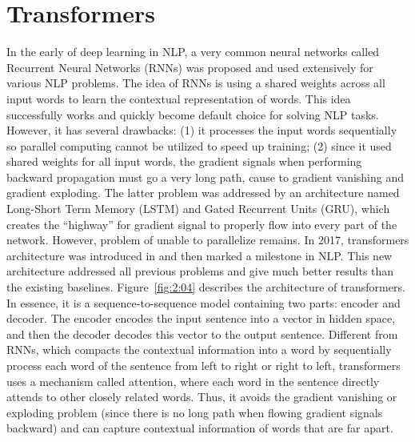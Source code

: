 \documentclass[3p, sort&compress, 12pt]{elsarticle}
\begin{document}
\section{Transformers}
In the early of deep learning in NLP, a very common neural networks called Recurrent Neural Networks (RNNs) was proposed and used extensively for various NLP problems. The idea of RNNs is using a shared weights across all input words to learn the contextual representation of words. This idea successfully works and quickly become default choice for solving NLP tasks. However, it has several drawbacks: (1) it processes the input words sequentially so parallel computing cannot be utilized to speed up training; (2) since it used shared weights for all input words, the gradient signals when performing backward propagation must go a very long path, cause to gradient vanishing and gradient exploding. The latter problem was addressed by an architecture named Long-Short Term Memory (LSTM) and Gated Recurrent Units (GRU), which creates the “highway” for gradient signal to properly flow into every part of the network. However, problem of unable to parallelize remains. In 2017, transformers architecture was introduced in \cite{vaswani2017attention} and then marked a milestone in NLP. This new architecture addressed all previous problems and give much better results than the existing baselines. Figure~\ref{fig:2:04} describes the architecture of transformers. In essence, it is a sequence-to-sequence model containing two parts: encoder and decoder. The encoder encodes the input sentence into a vector in hidden space, and then the decoder decodes this vector to the output sentence. Different from RNNs, which compacts the contextual information into a word by sequentially process each word of the sentence from left to right or right to left, transformers uses a mechanism called attention, where each word in the sentence directly attends to other closely related words. Thus, it avoids the gradient vanishing or exploding problem (since there is no long path when flowing gradient signals backward) and can capture contextual information of words that are far apart.
\end{document}
